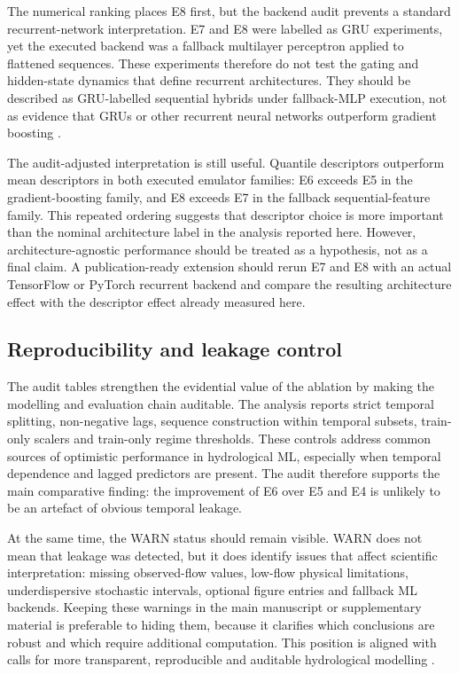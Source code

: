 \documentclass[a4paper,fleqn]{cas-sc}
\begin{document}
The numerical ranking places E8 first, but the backend audit prevents a
standard recurrent-network interpretation. E7 and E8 were labelled as
GRU experiments, yet the executed backend was a fallback multilayer
perceptron applied to flattened sequences. These experiments therefore
do not test the gating and hidden-state dynamics that define recurrent
architectures. They should be described as GRU-labelled sequential
hybrids under fallback-MLP execution, not as evidence that GRUs or other
recurrent neural networks outperform gradient boosting
\citep{kratzert2018rainfall,kratzert2019towards}.

The audit-adjusted interpretation is still useful. Quantile descriptors
outperform mean descriptors in both executed emulator families: E6
exceeds E5 in the gradient-boosting family, and E8 exceeds E7 in the
fallback sequential-feature family. This repeated ordering suggests
that descriptor choice is more important than the nominal architecture
label in the analysis reported here. However, architecture-agnostic
performance should be treated as a hypothesis, not as a final claim. A
publication-ready extension should rerun E7 and E8 with an actual
TensorFlow or PyTorch recurrent backend and compare the resulting
architecture effect with the descriptor effect already measured here.

\subsection{Reproducibility and leakage control}
\label{subsec:discussion-leakage}

The audit tables strengthen the evidential value of the ablation by making the modelling and evaluation chain auditable. The analysis reports strict temporal splitting, non-negative lags, sequence construction within temporal subsets, train-only scalers and train-only
regime thresholds. These controls address common sources of optimistic performance in hydrological ML, especially when temporal dependence and lagged predictors are present. The audit therefore supports the main comparative finding: the improvement of E6 over E5 and E4 is unlikely to be an artefact of obvious temporal leakage.

At the same time, the WARN status should remain visible. WARN does not mean that leakage was detected, but it does identify issues that affect scientific interpretation: missing observed-flow values, low-flow physical limitations, underdispersive stochastic intervals, optional figure entries and fallback ML backends. Keeping these warnings in the main manuscript or supplementary material is preferable to hiding them, because it clarifies which conclusions are robust and which require additional computation. This position is aligned with calls for more transparent, reproducible and auditable hydrological modelling
\citep{hall2021hydrologist,lees2021benchmarking,arsenault2022continuous}.
\end{document}
